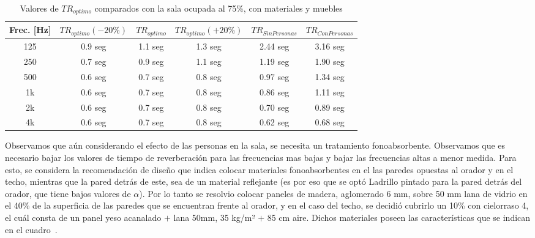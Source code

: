 \begin{table}[H]
    \centering
    \begin{tabular}{|c|c|c|c|c|c|} \hline
        Frec. [Hz] &$TR_{optimo}(-20\%)$& $TR_{optimo}$ & $TR_{optimo}(+20\%)$  & $TR_{SinPersonas}$ & $TR_{ConPersonas}$ \\  \hline
        125 & 0.9 seg & 1.1 seg & 1.3 seg & 2.44 seg & 3.16 seg \\ \hline
        250 & 0.7 seg & 0.9 seg & 1.1 seg & 1.19 seg & 1.90 seg \\ \hline
        500 & 0.6 seg & 0.7 seg & 0.8 seg & 0.97 seg & 1.34 seg \\ \hline
        1k & 0.6 seg & 0.7 seg & 0.8 seg & 0.86 seg & 1.11 seg \\ \hline
        2k & 0.6 seg & 0.7 seg & 0.8 seg & 0.70 seg & 0.89 seg \\ \hline
        4k & 0.6 seg & 0.7 seg & 0.8 seg & 0.62 seg & 0.68 seg \\ \hline
    \end{tabular}
    \caption{Valores de $TR_{optimo}$ comparados con la sala ocupada al 75\%, con materiales y muebles}
    \label{tab:TR_conPersonas}
\end{table}


\par Observamos que aún considerando el efecto de las personas en la sala, se necesita un tratamiento fonoabsorbente. Observamos que es necesario bajar los valores de tiempo de reverberación para las frecuencias mas bajas y bajar las frecuencias altas a menor medida. Para esto, se considera la recomendación de diseño que indica colocar materiales fonoabsorbentes en el las paredes opuestas al orador y en el techo, mientras que la pared detrás de este, sea de un material reflejante (es por eso que se optó Ladrillo pintado para la pared detrás del orador, que tiene bajos valores de $\alpha$). Por lo tanto se resolvio colocar paneles de madera, aglomerado 6 mm, sobre 50 mm lana de vidrio en el 40\% de la superficia de las paredes que se encuentran frente al orador, y en el caso del techo, se decidió cubrirlo un 10\% con cielorraso 4, el cuál consta de un panel yeso acanalado $+$ lana 50mm, 35 kg/m² $+$ 85 cm aire. Dichos materiales poseen las características que se indican en el cuadro~.

